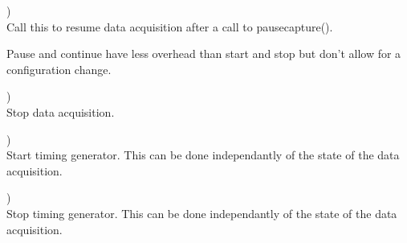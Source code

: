 		\device)\\
		Call this to resume data acquisition after a call to \textsf{\prefix pause\tu capture()}.\par
		Pause and continue have less overhead than start and stop but don't allow for a configuration change.\par

		\device)\\
		Stop data acquisition.\par

		\device)\\
		Start timing generator. This can be done independantly of the state of the data acquisition.\par

		\device)\\
		Stop timing generator. This can be done independantly of the state of the data acquisition.\par

	
